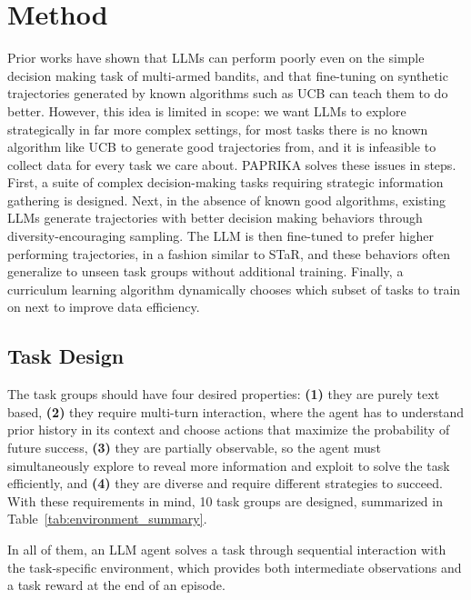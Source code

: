 \documentclass[manuscript,review]{acmart}
\begin{document}
\section{Method}
{
Prior works have shown that LLMs can perform poorly even on the simple decision making
task of multi-armed bandits\cite{krishnamurthy2024largelanguagemodelsexplore}, and that
fine-tuning on synthetic trajectories generated by known algorithms such as UCB can teach
them to do better\cite{nie2024evolveevaluatingoptimizingllms}. However, this idea is
limited in scope: we want LLMs to explore strategically in far more complex settings,
for most tasks there is no known algorithm like UCB to generate good trajectories from,
and it is infeasible to collect data for every task we care about. \textsc{PAPRIKA}
solves these issues in steps. First, a suite of complex decision-making tasks requiring
strategic information gathering is designed. Next, in the absence of known good algorithms,
existing LLMs generate trajectories with better decision making behaviors through
diversity-encouraging sampling. The LLM is then fine-tuned to prefer higher performing
trajectories, in a fashion similar to STaR\cite{zelikman2022starbootstrappingreasoningreasoning},
and these behaviors often generalize to unseen task groups without additional training.
Finally, a curriculum learning algorithm dynamically chooses which subset of tasks to
train on next to improve data efficiency.

\subsection{Task Design}
{
The task groups should have four desired properties: \textbf{(1)} they are purely text
based, \textbf{(2)} they require multi-turn interaction, where the agent has to understand
prior history in its context and choose actions that maximize the probability of future
success, \textbf{(3)} they are partially observable, so the agent must simultaneously
explore to reveal more information and exploit to solve the task efficiently, and
\textbf{(4)} they are diverse and require different strategies to succeed. With these
requirements in mind, 10 task groups are designed, summarized in
Table~\ref{tab:environment_summary}. 

In all of them, an LLM agent solves a task through
sequential interaction with the task-specific environment, which provides both
intermediate observations and a task reward at the end of an episode.

}}
\end{document}
